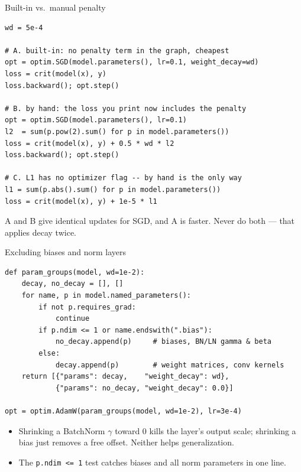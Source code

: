 \documentclass[10pt,aspectratio=169]{beamer}
\begin{document}
\begin{frame}[fragile]{Built-in vs.\ manual penalty}
\begin{lstlisting}
wd = 5e-4

# A. built-in: no penalty term in the graph, cheapest
opt = optim.SGD(model.parameters(), lr=0.1, weight_decay=wd)
loss = crit(model(x), y)
loss.backward(); opt.step()

# B. by hand: the loss you print now includes the penalty
opt = optim.SGD(model.parameters(), lr=0.1)
l2  = sum(p.pow(2).sum() for p in model.parameters())
loss = crit(model(x), y) + 0.5 * wd * l2
loss.backward(); opt.step()

# C. L1 has no optimizer flag -- by hand is the only way
l1 = sum(p.abs().sum() for p in model.parameters())
loss = crit(model(x), y) + 1e-5 * l1
\end{lstlisting}
A and B give identical updates for SGD, and A is faster. Never do both --- that applies decay
twice.
\end{frame}

\begin{frame}[fragile]{Excluding biases and norm layers}
\begin{lstlisting}
def param_groups(model, wd=1e-2):
    decay, no_decay = [], []
    for name, p in model.named_parameters():
        if not p.requires_grad:
            continue
        if p.ndim <= 1 or name.endswith(".bias"):
            no_decay.append(p)     # biases, BN/LN gamma & beta
        else:
            decay.append(p)        # weight matrices, conv kernels
    return [{"params": decay,    "weight_decay": wd},
            {"params": no_decay, "weight_decay": 0.0}]

opt = optim.AdamW(param_groups(model, wd=1e-2), lr=3e-4)
\end{lstlisting}
\begin{itemize}
    \item Shrinking a BatchNorm $\gamma$ toward 0 kills the layer's output scale; shrinking a bias
          just removes a free offset. Neither helps generalization.
    \item The \texttt{p.ndim <= 1} test catches biases and all norm parameters in one line.
\end{itemize}
\end{frame}
\end{document}
